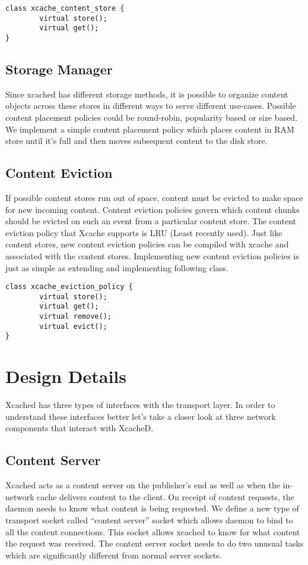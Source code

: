 {
\begin{verbatim}
class xcache_content_store {
        virtual store();
        virtual get();
}
\end{verbatim}
}

\subsection{Storage Manager}
Since xcached has different storage methods, it is possible to
organize content objects across these stores in different ways to
serve different use-cases. Possible content placement policies could
be round-robin, popularity based or size based. We implement a simple
content placement policy which places content in RAM store until it’s
full and then moves subsequent content to the disk store.

\subsection{Content Eviction}
If possible content stores run out of space, content must be evicted
to make space for new incoming content. Content eviction policies
govern which content chunks should be evicted on such an event from a
particular content store. The content eviction policy that Xcache
supports is LRU (Least recently used). Just like content stores, new
content eviction policies can be compiled with xcache and associated
with the content stores. Implementing new content eviction policies is
just as simple as extending and implementing following class.

{
\begin{verbatim}
class xcache_eviction_policy {
        virtual store();
        virtual get();
        virtual remove();
        virtual evict();
}
\end{verbatim}
}


\section {Design Details}

Xcached has three types of interfaces with the transport layer. In
order to understand these interfaces better let's take a closer look
at three network components that interact with XcacheD.

\subsection{Content Server}
Xcached acts as a content server on the publisher's end as well as
when the in-network cache delivers content to the client. On receipt
of content requests, the daemon needs to know what content is being
requested. We define a new type of transport socket called ``content
server'' socket which allows daemon to bind to all the content
connections. This socket allows xcached to know for what content the
request was received.  The content server socket needs to do two
unusual tasks which are significantly different from normal server
sockets.

